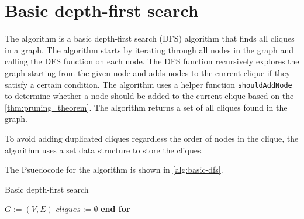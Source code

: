 \section{Basic depth-first search}
The algorithm is a basic depth-first search (DFS) algorithm that finds all cliques in a graph. The algorithm starts by iterating through all nodes in the graph and calling the DFS function on each node. The DFS function recursively explores the graph starting from the given node and adds nodes to the current clique if they satisfy a certain condition. The algorithm uses a helper function \texttt{shouldAddNode} to determine whether a node should be added to the current clique based on the \autoref{thm:pruning_theorem}. The algorithm returns a set of all cliques found in the graph.

To avoid adding duplicated cliques regardless the order of nodes in the clique, the algorithm uses a set data structure to store the cliques.

The Psuedocode for the algorithm is shown in \autoref{alg:basic-dfs}.


\begin{algorithm}
    \caption{Basic depth-first search}
    \label{alg:basic-dfs}



    $G := (V,E)$ 
    $cliques := \emptyset$ 
    \textbf{end for}

\end{algorithm}